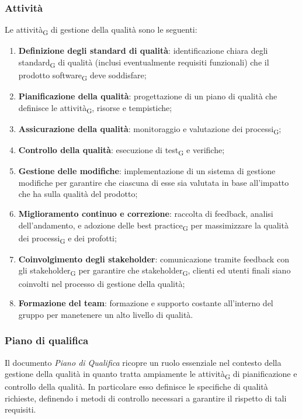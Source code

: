 \subsubsection{Attività}
Le {attività\textsubscript{G}} di gestione della qualità sono le seguenti:
\begin{enumerate}
    \item \textbf{Definizione degli standard di qualità}: identificazione chiara degli {standard\textsubscript{G}} di qualità
    (inclusi eventualmente requisiti funzionali) che il prodotto {software\textsubscript{G}} deve soddisfare;
    \item \textbf{Pianificazione della qualità}: progettazione di un piano di qualità che definisce le {attività\textsubscript{G}},
    risorse e tempistiche;
    \item \textbf{Assicurazione della qualità}: monitoraggio e valutazione dei {processi\textsubscript{G}};
    \item \textbf{Controllo della qualità}: esecuzione di {test\textsubscript{G}} e verifiche;
    \item \textbf{Gestione delle modifiche}: implementazione di un sistema di gestione modifiche per garantire che ciascuna di esse sia valutata
    in base all'impatto che ha sulla qualità del prodotto;
    \item \textbf{Miglioramento continuo e correzione}: raccolta di feedback, analisi dell'andamento, e adozione delle 
    {best practice\textsubscript{G}} per massimizzare la qualità dei {processi\textsubscript{G}} e dei profotti;
    \item \textbf{Coinvolgimento degli stakeholder}: comunicazione tramite feedback con gli {stakeholder\textsubscript{G}} 
    per garantire che {stakeholder\textsubscript{G}}, clienti ed utenti finali siano coinvolti nel processo di gestione della qualità;
    \item \textbf{Formazione del team}: formazione e supporto costante all'interno del gruppo per manetenere un alto livello di qualità.
\end{enumerate}

\subsubsection{Piano di qualifica}
Il documento \textit{Piano di Qualifica} ricopre un ruolo essenziale nel contesto della gestione della qualità in quanto tratta ampiamente
le {attività\textsubscript{G}} di pianificazione e controllo della qualità. In particolare esso definisce le specifiche di qualità
richieste, definendo i metodi di controllo necessari a garantire il rispetto di tali requisiti.

